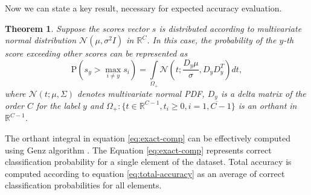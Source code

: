 \documentclass[nohyperref]{article}
\theoremstyle{plain}
\newtheorem{theorem}{Theorem}[section]
\theoremstyle{definition}
\theoremstyle{remark}
\begin{document}
Now we can state a key result, necessary for expected accuracy evaluation.
\vskip 0.05in
\begin{theorem}
Suppose the scores vector $s$ is distributed according to multivariate normal distribution $\mathcal{N}(\mu, \sigma^2 I)$ in $\mathbb{R}^C$. In this case, the probability of the $y$-th score exceeding other scores can be represented as
\begin{equation}
    \mathrm{P}(s_y > \max\limits_{i \ne y} s_i) = \int\limits_{\Omega_+}\mathcal{N}(t; \frac{D_y\mu}{\sigma}, D_yD_y^T) dt,
    \label{eq:exact-comp}
\end{equation}
where $\mathcal{N}(t; \mu, \Sigma)$ denotes multivariate normal PDF, $D_y$ is a delta matrix of the order $C$ for the label $y$ and $\Omega_+: \{t \in \mathbb{R}^{C-1}, t_i \ge 0, i = \overline{1,C-1}\}$ is an orthant in $\mathbb{R}^{C-1}$.
\end{theorem}
The orthant integral in equation \ref{eq:exact-comp} can be effectively computed using Genz algorithm \cite{genz1992numerical}. The Equation \ref{eq:exact-comp} represents correct classification probability for a single element of the dataset. Total accuracy is computed according to equation \ref{eq:total-accuracy} as an average of correct classification probabilities for all elements.
\end{document}
